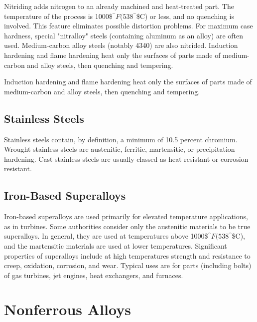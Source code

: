 \documentclass[a4paper,openany,12pt]{book}
\begin{document}
Nitriding adds nitrogen to an already machined and heat-treated part.
The temperature of the process is 1000\$\(^{\^{}} F (538\)\(^{\^{}}\)\$C) or
less, and no quenching is involved. This feature eliminates possible
distortion problems. For maximum case hardness, special "nitralloy"
steels (containing aluminum as an alloy) are often used. Medium-carbon
alloy steels (notably 4340) are also nitrided. Induction hardening and
flame hardening heat only the surfaces of parts made of medium-carbon
and alloy steels, then quenching and tempering.

Induction hardening and flame hardening heat only the surfaces of parts
made of medium-carbon and alloy steels, then quenching and tempering.

\subsection{Stainless Steels}
\label{sec:orge588aa8}
Stainless steels contain, by definition, a minimum of 10.5 percent
chromium. Wrought stainless steels are austenitic, ferritic,
martensitic, or precipitation hardening. Cast stainless steels are
usually classed as heat-resistant or corrosion-resistant.

\subsection{Iron-Based Superalloys}
\label{sec:orgfe5be40}
Iron-based superalloys are used primarily for elevated temperature
applications, as in turbines. Some authorities consider only the
austenitic materials to be true superalloys. In general, they are used
at temperatures above 1000\$\(^{\^{}} F (538\)\(^{\^{}}\)\$C), and the
martensitic materials are used at lower temperatures. Significant
properties of superalloys include at high temperatures strength and
resistance to creep, oxidation, corrosion, and wear. Typical uses are
for parts (including bolts) of gas turbines, jet engines, heat
exchangers, and furnaces.

\section{Nonferrous Alloys}
\label{sec:org32f3776}
\end{document}
